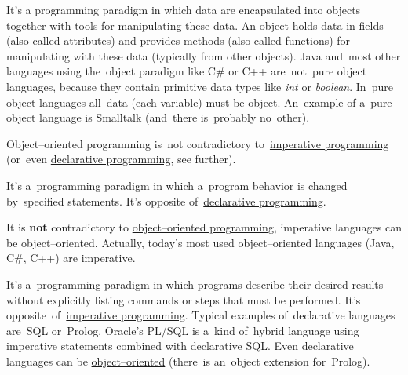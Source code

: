 \label{objectorientedprogramming}
It's a programming paradigm in which data are encapsulated into objects together with tools for manipulating these data. An object holds data in fields (also called attributes) and provides methods (also called functions) for manipulating with these data (typically from other objects). Java and~most other languages using the~object paradigm like C\# or C++ are~not~pure object languages, because they contain primitive data types like \textit{int} or \textit{boolean}. In~pure object languages all~data (each variable) must be object. An~example of a~pure object language is Smalltalk (and~there is~probably no~other).

\warning Object--oriented programming is~not contradictory to~\hyperref[imperativeprogramming]{imperative programming} (or~even \hyperref[declarativeprogramming]{declarative programming}, see further).








\label{imperativeprogramming}
It's a~programming paradigm in which a~program behavior is changed by~specified statements. It's opposite of~\hyperref[declarativeprogramming]{declarative programming}.

\warning It is \textbf{not} contradictory to \hyperref[objectorientedprogramming]{object--oriented programming}, imperative languages can be object--oriented. Actually, today's most used object--oriented languages (Java, C\#, C++) are imperative.

\label{declarativeprogramming}
It's a~programming paradigm in which programs describe their desired results without explicitly listing commands or steps that must be performed. It's opposite~of~\hyperref[imperativeprogramming]{imperative programming}. Typical examples of~declarative languages are~SQL or~Prolog. Oracle's PL/SQL is a~kind of~hybrid language using imperative statements combined with declarative SQL. Even declarative languages can be \hyperref[objectorientedprogramming]{object--oriented} (there~is an~object extension for~Prolog).

